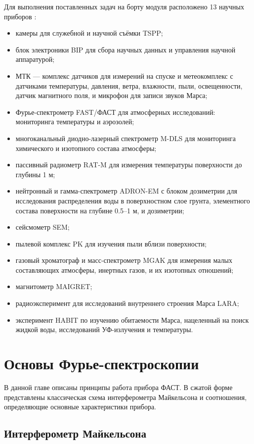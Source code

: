 \documentclass{mipt-thesis-bs}
\begin{document}
Для выполнения поставленных задач на борту модуля расположено 13 научных приборов \cite{rodionov2018exomars}:
 	\begin{itemize}
\item  камеры для служебной и научной съёмки TSPP;
 \item блок электроники BIP для сбора научных данных и управления научной аппаратурой;
 \item МТК — комплекс датчиков для измерений на спуске и метеокомплекс с датчиками температуры, давления, ветра, влажности, пыли, освещенности, датчик магнитного поля, и микрофон для записи звуков Марса;
 \item Фурье-спектрометр FAST/ФАСТ для атмосферных исследований: мониторинга температуры и аэрозолей;
 \item многоканальный диодно-лазерный спектрометр M-DLS для мониторинга химического и изотопного состава атмосферы;
 \item пассивный радиометр RAT-M для измерения температуры поверхности до глубины 1 м;
 \item нейтронный и гамма-спектрометр ADRON-EM с блоком дозиметрии для исследования распределения воды в поверхностном слое грунта, элементного состава поверхности на глубине 0.5–1 м, и дозиметрии;
\item сейсмометр SEM;
\item пылевой комплекс PK для изучения пыли вблизи поверхности;
\item газовый хроматограф и масс-спектрометр MGAK для измерения малых составляющих атмосферы, инертных газов, и их изотопных отношений;
 \item магнитометр MAIGRET;
 \item радиоэксперимент для исследований внутреннего строения Марса LARA;
 \item эксперимент HABIT по изучению обитаемости Марса, нацеленный на поиск жидкой воды, исследований УФ-излучения и температуры.
  \end{itemize}

	\chapter{Основы Фурье-спектроскопии}
	
	В данной главе описаны принципы работа прибора ФАСТ. В сжатой форме представлены классическая схема интерферометра Майкельсона и соотношения, определяющие основные характеристики прибора.
	
	\section{Интерферометр Майкельсона}
	
\end{document}
